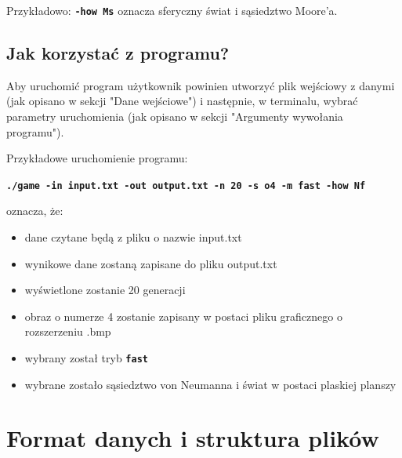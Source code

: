 \documentclass[a4paper]{article}
\begin{document}
\begin{itemize}
\begin{itemize}
				

				Przyk\l{}adowo: \texttt{\textbf{-how Ms}} oznacza sferyczny \'swiat i s\k{a}siedztwo Moore'a.
		\end{itemize}

\end{itemize}

\subsection{Jak korzysta\'c z programu?}
\quad Aby uruchomi\'c program u\.zytkownik powinien utworzy\'c plik wej\'sciowy z danymi (jak opisano w sekcji "Dane wej\'sciowe") i nast\k{e}pnie, w terminalu, wybra\'c parametry uruchomienia (jak opisano w sekcji "Argumenty wywo\l{}ania programu").

Przyk\l{}adowe uruchomienie programu:
\begin{center}
	\texttt{\textbf{./game -in input.txt -out output.txt -n 20 -s o4 -m fast -how Nf}}
\end{center}
oznacza, \.ze:
\begin{itemize}
	\item dane czytane b\k{e}d\k{a} z pliku o nazwie input.txt
	\item wynikowe dane zostan\k{a} zapisane do pliku output.txt
	\item wy\'swietlone zostanie 20 generacji
	\item obraz o numerze 4 zostanie zapisany w postaci pliku graficznego o rozszerzeniu .bmp
	\item wybrany zosta\l{} tryb \texttt{\textbf{fast}}
	\item wybrane zosta\l{}o s\k{a}siedztwo von Neumanna i \'swiat w postaci plaskiej planszy
\end{itemize}


\section{Format danych i struktura plik\'ow}
\end{document}

